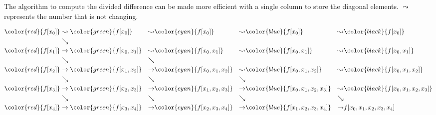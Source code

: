 \begin{remark}
    The algorithm to compute the divided difference can be made more efficient with a single column to store the diagonal elements. $\leadsto$ represents the number that is not changing.
    \begin{tcolorbox}
        \begin{equation}
        \begin{aligned}
            \color{red}{f[x_0]} &    \leadsto  \color{green}{f[x_0]}          & \leadsto& \color{cyan}{f[x_0]} &\leadsto& \color{blue}{f[x_0]} &\leadsto& \color{black}{f[x_0]}\\ 
                   &\searrow       &\\ 
                   \color{red}{f[x_1]} &\to \color{green}{f[x_0, x_1]}&  \leadsto& \color{cyan}{f[x_0, x_1]}  &\leadsto& \color{blue}{f[x_0, x_1]} &\leadsto& \color{black}{f[x_0, x_1]}\\
                   &\searrow        &\searrow&\\ 
                   \color{red}{f[x_2]} & \to \color{green}{f[x_1, x_2]}&\to& \color{cyan}{f[x_0, x_1, x_2]} &\leadsto& \color{blue}{f[x_0, x_1, x_2]}&\leadsto& \color{black}{f[x_0, x_1, x_2]}\\
                   &\searrow        &\searrow& &\searrow&\\ 
                   \color{red}{f[x_3]} &\to \color{green}{f[x_2, x_3] }&\to& \color{cyan}{f[x_1, x_2, x_3]} &\to & \color{blue}{f[x_0, x_1, x_2, x_3]}&\leadsto& \color{black}{f[x_0, x_1, x_2, x_3]}\\
                   &\searrow        &\searrow & &\searrow&  &\searrow &\\ 
                   \color{red}{f[x_4]} & \to \color{green}{f[x_3, x_4]}&\to& \color{cyan}{f[x_2, x_3, x_4]} &\to & \color{blue}{f[x_1, x_2, x_3, x_4]} &\to&  f[x_0, x_1, x_2, x_3, x_4] 
        \end{aligned}
    \end{equation}
    \end{tcolorbox}
\end{remark}


